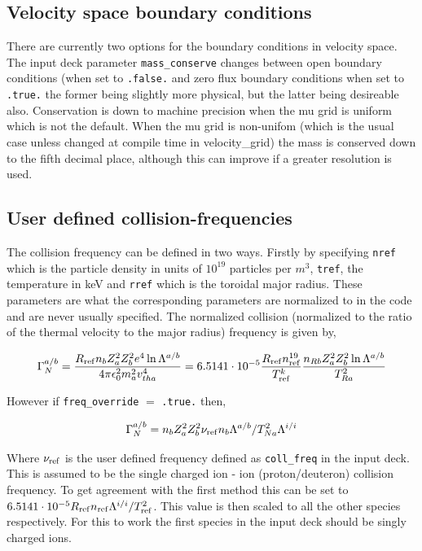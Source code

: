 \documentclass{report}
\def\be{\begin{equation}}
\def\ee{\end{equation}}
\begin{document}
\subsection{Velocity space boundary conditions}

There are currently two options for the boundary conditions in velocity space.  The input deck parameter \texttt{mass\_conserve} changes between open boundary conditions (when set to \texttt{.false.} and zero flux boundary conditions when set to \texttt{.true.} the former being slightly more physical, but the latter being desireable also.  Conservation is down to machine precision when the mu grid is uniform which is not the default.  When the mu grid is non-unifom (which is the usual case unless changed at compile time in velocity\_grid) the mass is conserved down to the fifth decimal place, although this can improve if a greater resolution is used.

\subsection{User defined collision-frequencies}

The collision frequency can be defined in two ways.  Firstly by specifying \texttt{nref} which is the particle density in units of $10^{19}$ particles per $m^{3}$, \texttt{tref}, the temperature in keV and \texttt{rref} which is the toroidal major radius.  These parameters are what the corresponding parameters are normalized to in the code and are never usually specified.  The normalized collision (normalized to the ratio of the thermal velocity to the major radius) frequency is given by,

\be 
\Gamma^{a/b}_N = {R_{\rm ref} n_b Z_a^2 Z_b^2 e^4 \ln \Lambda^{a/b} \over 4 \pi \epsilon_0^2 m_a^2 v_{tha}^4} = 
6.5141\cdot 10^{-5} {R_{\rm ref} n_{\rm ref}^{19} \over T_{\rm ref}^k}  {n_{Rb} Z_a^2 Z_b^2 \ln \Lambda^{a/b} 
\over T_{Ra}^2}
\ee

However if \texttt{freq\_override} $=$ \texttt{.true.} then,

\be
\Gamma^{a/b}_N =  n_b Z_a^2 Z_b^2 \nu_{\rm ref} n_b \Lambda^{a/b}/ T_{Na}^2 \Lambda^{i/i}
\ee

Where $\nu_{\rm ref}$ is the user defined frequency defined as \texttt{coll\_freq} in the input deck.  This is assumed to be the single charged ion - ion (proton/deuteron) collision frequency.  To get agreement with the first method this can be set to $6.5141\cdot 10^{-5}R_{\rm ref}n_{\rm ref}\Lambda^{i/i}/T_{\rm ref}^{2}$.  This value is then scaled to all the other species respectively.  For this to work the first species in the input deck should be singly charged ions.
\end{document}
